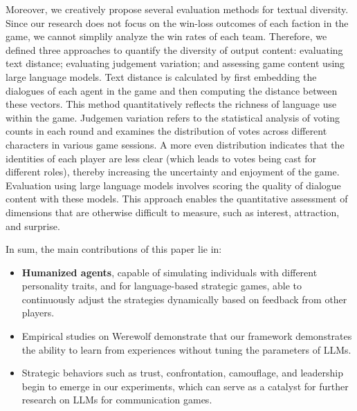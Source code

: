 Moreover, we creatively propose several evaluation methods for textual diversity. Since our research does not focus on the win-loss outcomes of each faction in the game, we cannot simplily analyze the win rates of each team. Therefore, we defined three approaches to quantify the diversity of output content: evaluating text distance; evaluating judgement variation; and assessing game content using large language models. Text distance is calculated by first embedding the dialogues of each agent in the game \citep{mikolov2013efficient} and then computing the distance between these vectors. This method quantitatively reflects the richness of language use within the game. Judgemen variation refers to the statistical analysis of voting counts in each round and examines the distribution of votes across different characters in various game sessions. A more even distribution indicates that the identities of each player are less clear (which leads to votes being cast for different roles), thereby increasing the uncertainty and enjoyment of the game. Evaluation using large language models \citep{shao2023character,wang2024incharacter} involves scoring the quality of dialogue content with these models. This approach enables the quantitative assessment of dimensions that are otherwise difficult to measure, such as interest, attraction, and surprise.

In sum, the main contributions of this paper lie in:

\begin{itemize} 
  \item {\bf Humanized agents}, capable of simulating individuals with different personality traits, and for language-based strategic games, able to continuously adjust the strategies dynamically based on feedback from other players.
  \item {\color{red}}Empirical studies on Werewolf demonstrate that our framework demonstrates the ability to learn from experiences without tuning the parameters of LLMs.
  \item Strategic behaviors such as trust, confrontation, camouflage, and leadership begin to emerge in our experiments, which can serve as a catalyst for further research on LLMs for communication games.
\end{itemize}